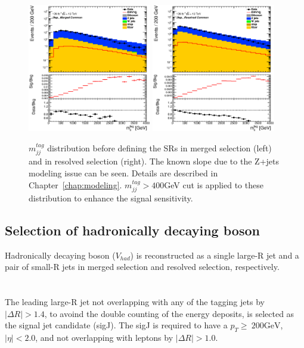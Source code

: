 \begin{figure}[ht]
    \centering
    \includegraphics[width=0.48\textwidth]{figures/2lep/dataMC/C_0ptag1pfat0pjet_0ptv_MergedCommon_MTagMerJets_Log}
    \includegraphics[width=0.48\textwidth]{figures/2lep/dataMC/C_0ptag2pjet_0ptv_ResolvedCommon_MTagResJets_Log} 
    \caption{$m^{tag}_{jj}$ distribution before defining the SRs in merged selection (left) and in resolved selection (right). The known slope due to the Z+jets modeling issue can be seen. Details are described in Chapter~\ref{chap:modeling}. $m^{tag}_{jj} > 400$GeV cut is applied to these distribution to enhance the signal sensitivity.}
    \label{fig:Mtagjj}
\end{figure}

\subsection{Selection of hadronically decaying boson}
Hadronically decaying boson ($V_{had}$) is reconstructed as a single large-R jet and a pair of small-R jets in merged selection and resolved selection, respectively. \\ \\
\noindent\textbf{}  \\
The leading large-R jet not overlapping with any of the tagging jets by $|\Delta R|>1.4$, to avoind the double counting of the energy deposits, is selected as the signal jet candidate (sigJ).
The sigJ is required to have a $p_{T} \geq ~200 \mathrm{GeV}$, $|\eta| < 2.0$, and not overlapping with leptons by $|\Delta R|>1.0$.

